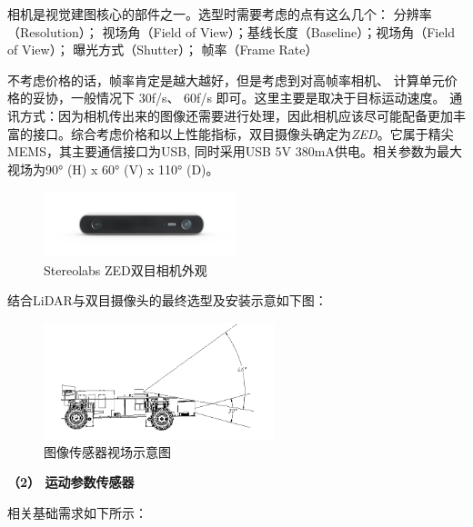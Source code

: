 
相机是视觉建图核心的部件之一。选型时需要考虑的点有这么几个： 分辨率（Resolution）； 视场角（Field of View）；基线长度（Baseline）；视场角（Field of View）； 曝光方式（Shutter）； 帧率（Frame Rate）

不考虑价格的话，帧率肯定是越大越好，但是考虑到对高帧率相机、 计算单元价格的妥协，一般情况下 30f/s、 60f/s 即可。这里主要是取决于目标运动速度。 通讯方式：因为相机传出来的图像还需要进行处理，因此相机应该尽可能配备更加丰富的接口。综合考虑价格和以上性能指标，双目摄像头确定为\emph{ZED}。它属于精尖MEMS，其主要通信接口为USB, 同时采用USB 5V 380mA供电。相关参数为最大视场为90° (H) x 60° (V) x 110° (D)。

\begin{figure}[H]
	\centering
	\includegraphics[width = 0.5\textwidth]{fig/zed.jpg}
	\caption{Stereolabs ZED双目相机外观}
	\label{zed}
\end{figure}

结合LiDAR与双目摄像头的最终选型及安装示意如下图：

\begin{figure}[H]
	\centering
	\includegraphics[width = 0.6\textwidth]{fig/sjyj.png}
	\caption{图像传感器视场示意图}
	\label{sjyj}
\end{figure}


\textbf{（2） 运动参数传感器}

相关基础需求如下所示：

